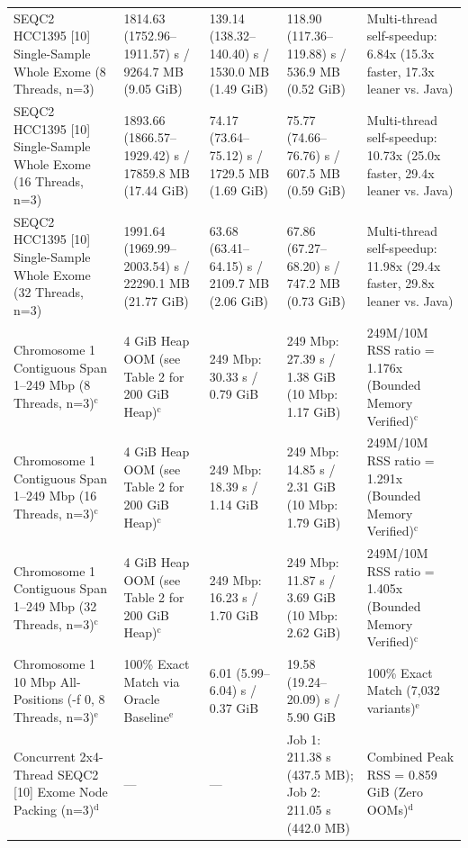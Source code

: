 \begin{table}[htbp]
{\begin{tabular}{lllll}
SEQC2 HCC1395 [10] Single-Sample Whole Exome (8 Threads, n=3) & 1814.63 (1752.96--1911.57) s / 9264.7 MB (9.05 GiB) & 139.14 (138.32--140.40) s / 1530.0 MB (1.49 GiB) & 118.90 (117.36--119.88) s / 536.9 MB (0.52 GiB) & Multi-thread self-speedup: 6.84x (15.3x faster, 17.3x leaner vs. Java) \\
SEQC2 HCC1395 [10] Single-Sample Whole Exome (16 Threads, n=3) & 1893.66 (1866.57--1929.42) s / 17859.8 MB (17.44 GiB) & 74.17 (73.64--75.12) s / 1729.5 MB (1.69 GiB) & 75.77 (74.66--76.76) s / 607.5 MB (0.59 GiB) & Multi-thread self-speedup: 10.73x (25.0x faster, 29.4x leaner vs. Java) \\
SEQC2 HCC1395 [10] Single-Sample Whole Exome (32 Threads, n=3) & 1991.64 (1969.99--2003.54) s / 22290.1 MB (21.77 GiB) & 63.68 (63.41--64.15) s / 2109.7 MB (2.06 GiB) & 67.86 (67.27--68.20) s / 747.2 MB (0.73 GiB) & Multi-thread self-speedup: 11.98x (29.4x faster, 29.8x leaner vs. Java) \\
Chromosome 1 Contiguous Span 1--249 Mbp (8 Threads, n=3)$^{\text{c}}$ & 4 GiB Heap OOM (see Table 2 for 200 GiB Heap)$^{\text{c}}$ & 249 Mbp: 30.33 s / 0.79 GiB & 249 Mbp: 27.39 s / 1.38 GiB (10 Mbp: 1.17 GiB) & 249M/10M RSS ratio = 1.176x (Bounded Memory Verified)$^{\text{c}}$ \\
Chromosome 1 Contiguous Span 1--249 Mbp (16 Threads, n=3)$^{\text{c}}$ & 4 GiB Heap OOM (see Table 2 for 200 GiB Heap)$^{\text{c}}$ & 249 Mbp: 18.39 s / 1.14 GiB & 249 Mbp: 14.85 s / 2.31 GiB (10 Mbp: 1.79 GiB) & 249M/10M RSS ratio = 1.291x (Bounded Memory Verified)$^{\text{c}}$ \\
Chromosome 1 Contiguous Span 1--249 Mbp (32 Threads, n=3)$^{\text{c}}$ & 4 GiB Heap OOM (see Table 2 for 200 GiB Heap)$^{\text{c}}$ & 249 Mbp: 16.23 s / 1.70 GiB & 249 Mbp: 11.87 s / 3.69 GiB (10 Mbp: 2.62 GiB) & 249M/10M RSS ratio = 1.405x (Bounded Memory Verified)$^{\text{c}}$ \\
Chromosome 1 10 Mbp All-Positions (-f 0, 8 Threads, n=3)$^{\text{e}}$ & 100\% Exact Match via Oracle Baseline$^{\text{e}}$ & 6.01 (5.99--6.04) s / 0.37 GiB & 19.58 (19.24--20.09) s / 5.90 GiB & 100\% Exact Match (7,032 variants)$^{\text{e}}$ \\
Concurrent 2x4-Thread SEQC2 [10] Exome Node Packing (n=3)$^{\text{d}}$ & --- & --- & Job 1: 211.38 s (437.5 MB); Job 2: 211.05 s (442.0 MB) & Combined Peak RSS = 0.859 GiB (Zero OOMs)$^{\text{d}}$ \\
\hline
\end{tabular}%
}

\end{table}
